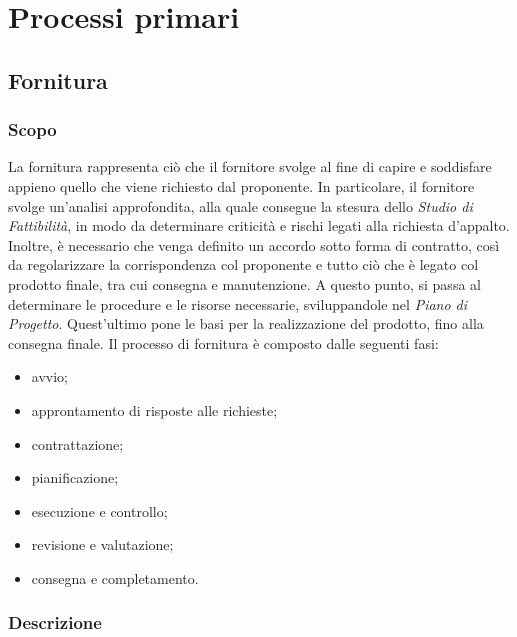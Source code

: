 \section{Processi primari}

\subsection{Fornitura}

\subsubsection{Scopo}

La fornitura rappresenta ciò che il fornitore svolge al fine di capire e soddisfare appieno quello che viene richiesto dal proponente.  In particolare,  il fornitore svolge un'analisi approfondita,  alla quale consegue la stesura dello \textit{Studio di Fattibilità},  in modo da determinare criticità e rischi legati alla richiesta d'appalto.  Inoltre,  è necessario che venga definito un accordo sotto forma di contratto,  così da regolarizzare la corrispondenza col proponente e tutto ciò che è legato col prodotto finale,  tra cui consegna e manutenzione.  A questo punto,  si passa al determinare le procedure e le risorse necessarie,  sviluppandole nel \textit{Piano di Progetto}.  Quest'ultimo pone le basi per la realizzazione del prodotto, fino alla consegna finale.  
Il processo di fornitura è composto dalle seguenti fasi:
\begin{itemize}

\item avvio;

\item approntamento di risposte alle richieste;

\item contrattazione;

\item pianificazione;

\item esecuzione e controllo;

\item revisione e valutazione;

\item consegna e completamento.

\end{itemize}

\subsubsection{Descrizione}

